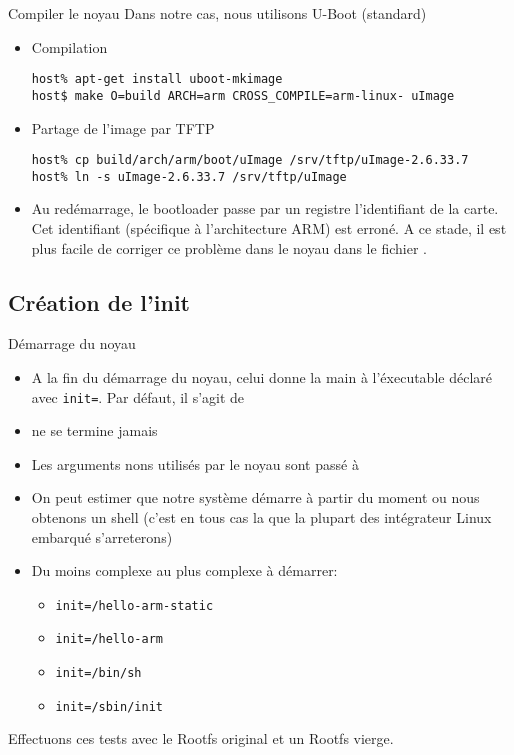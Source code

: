 \begin{frame}[fragile=singleslide]{Compiler le noyau}
  Dans notre cas, nous utilisons U-Boot (standard)
  \begin{itemize}
  \item Compilation
    \begin{lstlisting}
host% apt-get install uboot-mkimage
host$ make O=build ARCH=arm CROSS_COMPILE=arm-linux- uImage
    \end{lstlisting}
  \item Partage de l'image par TFTP
    \begin{lstlisting}
host% cp build/arch/arm/boot/uImage /srv/tftp/uImage-2.6.33.7
host% ln -s uImage-2.6.33.7 /srv/tftp/uImage
    \end{lstlisting} %
  \item  Au   redémarrage,  le   bootloader  passe  par   un  registre
    l'identifiant  de   la  carte.   Cet   identifiant  (spécifique  à
    l'architecture ARM) est erroné. A  ce stade, il est plus facile de
    corriger   ce   problème   dans   le   noyau   dans   le   fichier
    .
  \end{itemize}
\end{frame}


\subsection{Création de l'init}

\begin{frame}[fragile=singleslide]{Démarrage du noyau}
  \begin{itemize}
  \item  A  la fin  du  démarrage  du noyau,  celui  donne  la main  à
    l'éxecutable déclaré  avec \verb+init=+. Par défaut,  il s'agit de
  \item {} ne se termine jamais
  \item  Les  arguments  nons  utilisés  par le  noyau  sont  passé  à
  \item On peut  estimer que notre système démarre  à partir du moment
    ou nous  obtenons un shell (c'est  en tous cas  la que la
      plupart des intégrateur Linux embarqué s'arreterons)
  \item Du moins complexe au plus complexe à démarrer:
  \begin{itemize}
    \item \verb+init=/hello-arm-static+
    \item \verb+init=/hello-arm+
    \item \verb+init=/bin/sh+
    \item \verb+init=/sbin/init+
    \end{itemize}
  \end{itemize}
  Effectuons ces tests avec le Rootfs original et un Rootfs vierge.
\end{frame}

